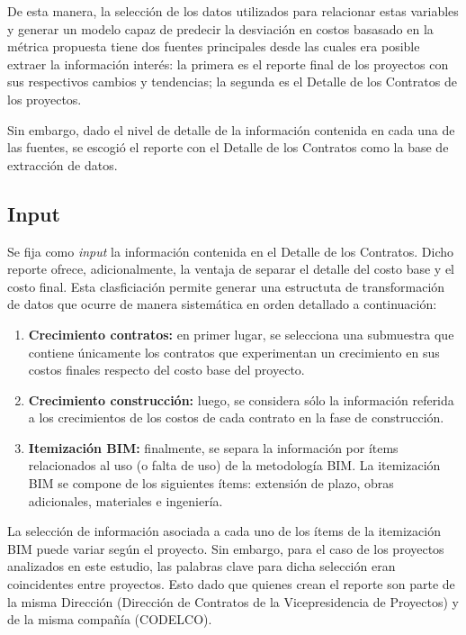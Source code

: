 De esta manera, la selección de los datos utilizados para relacionar estas variables y generar un modelo capaz de predecir la desviación en costos basasado en la métrica propuesta tiene dos fuentes principales desde las cuales era posible extraer la información interés: la primera es el reporte final de los proyectos con sus respectivos cambios y tendencias; la segunda es el Detalle de los Contratos de los proyectos.

Sin embargo, dado el nivel de detalle de la información contenida en cada una de las fuentes, se escogió el reporte con el Detalle de los Contratos como la base de extracción de datos.

\subsection{Input}

Se fija como \emph{input} la información contenida en el Detalle de los Contratos. Dicho reporte ofrece, adicionalmente, la ventaja de separar el detalle del costo base y el costo final. Esta clasficiación permite generar una estructuta de transformación de datos que ocurre de manera sistemática en orden detallado a continuación:

\begin{enumerate}
    \item \textbf{Crecimiento contratos:} en primer lugar, se selecciona una submuestra que contiene únicamente los contratos que experimentan un crecimiento en sus costos finales respecto del costo base del proyecto.
    
    \item \textbf{Crecimiento construcción:} luego, se considera sólo la información referida a los crecimientos de los costos de cada contrato en la fase de construcción.
    
    \item \textbf{Itemización BIM:} finalmente, se separa la información por ítems relacionados al uso (o falta de uso) de la metodología BIM. La itemización BIM se compone de los siguientes ítems: extensión de plazo, obras adicionales, materiales e ingeniería.
\end{enumerate}

La selección de información asociada a cada uno de los ítems de la itemización BIM puede variar según el proyecto. Sin embargo, para el caso de los proyectos analizados en este estudio, las palabras clave para dicha selección eran coincidentes entre proyectos. Esto dado que quienes crean el reporte son parte de la misma Dirección (Dirección de Contratos de la Vicepresidencia de Proyectos) y de la misma compañía (CODELCO).

